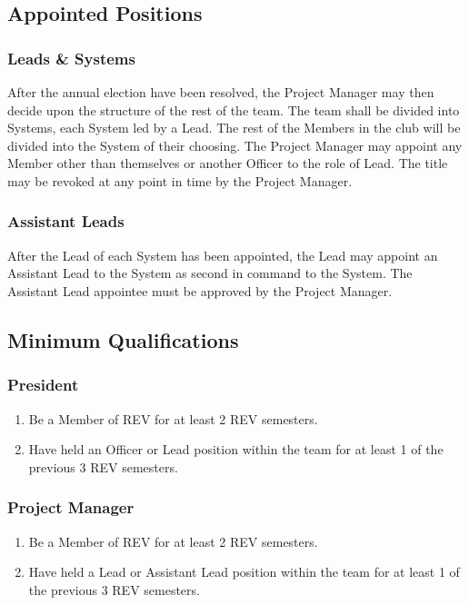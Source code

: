 \subsection{Appointed Positions}
\label{roles:appointed}

\subsubsection{Leads \& Systems}
\label{roles:appointed:leads}
After the annual election have been resolved, the Project Manager may then decide upon the structure of the rest of the team. The team shall be divided into Systems, each System led by a Lead. The rest of the Members in the club will be divided into the System of their choosing. The Project Manager may appoint any Member other than themselves or another Officer to the role of Lead. The title may be revoked at any point in time by the Project Manager.

\subsubsection{Assistant Leads}
\label{roles:appointed:assistant}
After the Lead of each System has been appointed, the Lead may appoint an Assistant Lead to the System as second in command to the System. The Assistant Lead appointee must be approved by the Project Manager.

\subsection{Minimum Qualifications}
\label{roles:qualifications}

\subsubsection{President}
\label{roles:qualifications:president}
\begin{enumerate}
\item Be a Member of REV for at least 2 REV semesters.
\item Have held an Officer or Lead position within the team for at least 1 of the previous 3 REV semesters.
\end{enumerate}

\subsubsection{Project Manager}
\label{roles:qualifications:pm}
\begin{enumerate}
\item Be a Member of REV for at least 2 REV semesters.
\item Have held a Lead or Assistant Lead position within the team for at least 1 of the previous 3 REV semesters.
\end{enumerate}

